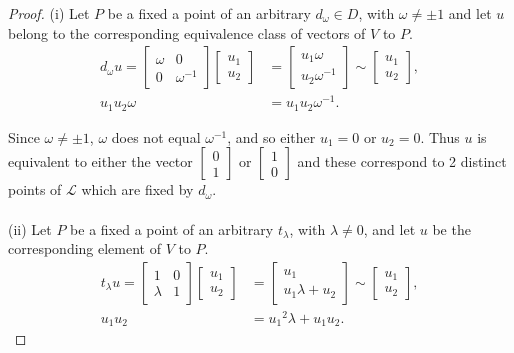 \begin{proof} 
(i) Let $P$ be a fixed a point of an arbitrary $d_\omega \in D$, with $\omega \neq \pm 1$ and let $u$ belong to the corresponding equivalence class of vectors of $V$ to $P$. \\
\begin{align*} d_\omega u = \begin{bmatrix} \omega & 0 \\ 0 & \omega^{-1} \end{bmatrix} \begin{bmatrix} u_1 \\ u_2 \end{bmatrix} &= \begin{bmatrix} u_1 \omega \\ u_2 \omega^{-1} \end{bmatrix} \sim \begin{bmatrix} u_1 \\ u_2 \end{bmatrix}, 
\\[1.5ex] u_1 u_2 \omega &= u_1 u_2 \omega^{-1}.
\end{align*}

Since $\omega \neq \pm 1$, $\omega$ does not equal $\omega^{-1}$, and so either $u_1 = 0$ or $u_2 = 0$. Thus $u$ is equivalent to either the vector $\begin{bmatrix} 0 \\ 1 \end{bmatrix}$ or $\begin{bmatrix} 1 \\ 0 \end{bmatrix}$ and these correspond to 2 distinct points of $\mathscr{L}$ which are fixed by $d_\omega$. \\
\\
(ii) Let $P$ be a fixed a point of an arbitrary $t_\lambda$, with $\lambda \neq 0$, and let $u$ be the corresponding element of $V$ to $P$. \\
\begin{align*} t_\lambda u = \begin{bmatrix} 1 & 0 \\ \lambda & 1 \end{bmatrix} \begin{bmatrix} u_1 \\ u_2 \end{bmatrix} &= \begin{bmatrix} u_1 \\ u_1 \lambda + u_2 \end{bmatrix} \sim \begin{bmatrix} u_1 \\ u_2 \end{bmatrix}, 
\\[1.5ex] u_1 u_2 &= {u_1}^2 \lambda + u_1 u_2.
\end{align*}


\end{proof}
